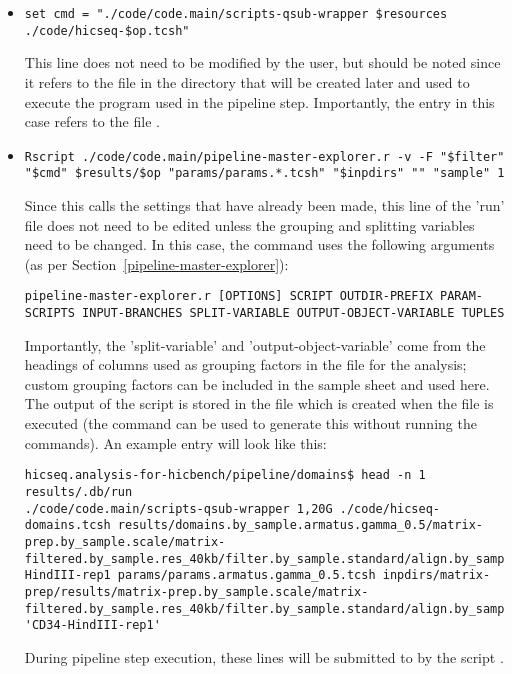 \begin{enumerate}
\begin{itemize}
\item \begin{lstlisting}
set cmd = "./code/code.main/scripts-qsub-wrapper $resources ./code/hicseq-$op.tcsh" 
\end{lstlisting}
This line does not need to be modified by the user, but should be noted since it refers to the file in the  directory that will be created later and used to execute the program used in the pipeline step. Importantly, the entry  in this case refers to the file . 
\item \begin{lstlisting}
Rscript ./code/code.main/pipeline-master-explorer.r -v -F "$filter" "$cmd" $results/$op "params/params.*.tcsh" "$inpdirs" "" "sample" 1
\end{lstlisting}
Since this calls the settings that have already been made, this line of the 'run' file does not need to be edited unless the grouping and splitting variables need to be changed. In this case, the command uses the following arguments (as per Section~\ref{pipeline-master-explorer}):
\begin{lstlisting}
pipeline-master-explorer.r [OPTIONS] SCRIPT OUTDIR-PREFIX PARAM-SCRIPTS INPUT-BRANCHES SPLIT-VARIABLE OUTPUT-OBJECT-VARIABLE TUPLES
\end{lstlisting}
Importantly, the 'split-variable' and 'output-object-variable' come from the headings of columns used as grouping factors in the  file for the analysis; custom grouping factors can be included in the sample sheet and used here. The output of the  script is stored in the file  which is created when the  file is executed (the command  can be used to generate this without running the commands). An example entry will look like this:
\begin{lstlisting}
hicseq.analysis-for-hicbench/pipeline/domains$ head -n 1 results/.db/run
./code/code.main/scripts-qsub-wrapper 1,20G ./code/hicseq-domains.tcsh results/domains.by_sample.armatus.gamma_0.5/matrix-prep.by_sample.scale/matrix-filtered.by_sample.res_40kb/filter.by_sample.standard/align.by_sample.bowtie2/CD34-HindIII-rep1 params/params.armatus.gamma_0.5.tcsh inpdirs/matrix-prep/results/matrix-prep.by_sample.scale/matrix-filtered.by_sample.res_40kb/filter.by_sample.standard/align.by_sample.bowtie2 'CD34-HindIII-rep1'
\end{lstlisting}
During pipeline step execution, these lines will be submitted to  by the script .


\end{itemize}
\end{enumerate}
